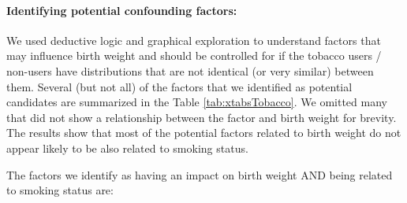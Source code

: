 \documentclass[a4paper, 12pt]{article}
\begin{document}
\paragraph{Identifying potential confounding factors:}
We used deductive logic and graphical exploration to understand factors that may influence birth weight and should be controlled for if the tobacco users / non-users have distributions that are not identical (or very similar) between them.  Several (but not all) of the factors that we identified as potential candidates are summarized in the Table \ref{tab:xtabsTobacco}.  We omitted many that did not show a relationship between the factor and birth weight for brevity.  The results show that most of the potential factors related to birth weight do not appear likely to be also related to smoking status.  \newline




The factors we identify as having an impact on birth weight AND being related to smoking status are:
\end{document}
